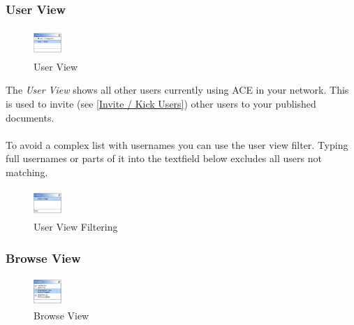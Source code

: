 \documentclass[11pt,a4paper]{article}
\begin{document}
\subsubsection{User View}
\begin{figure}[H]
\begin{center}
  \includegraphics[height=30pt, width=30pt]{../images/usermanual/uview_overview.bmp.eps}
\caption{User View}
\label{default}
\end{center}
\end{figure}

The \textit{User View} shows all other users currently using ACE in your network. This is used to invite (see \ref{Invite / Kick Users}) other users to your published documents. \\
\\
To avoid a complex list with usernames you can use the user view filter. Typing full usernames or parts of it into the textfield below excludes all users not matching.

\begin{figure}[H]
\begin{center}
  \includegraphics[height=30pt, width=30pt]{../images/usermanual/uview_filtering.bmp.eps}
\caption{User View Filtering}
\label{default}
\end{center}
\end{figure}

\subsubsection{Browse View}

\begin{figure}[H]
\begin{center}
  \includegraphics[height=30pt, width=30pt]{../images/usermanual/bview_overview.bmp.eps}
\caption{Browse View}
\label{default}
\end{center}
\end{figure}
\end{document}
